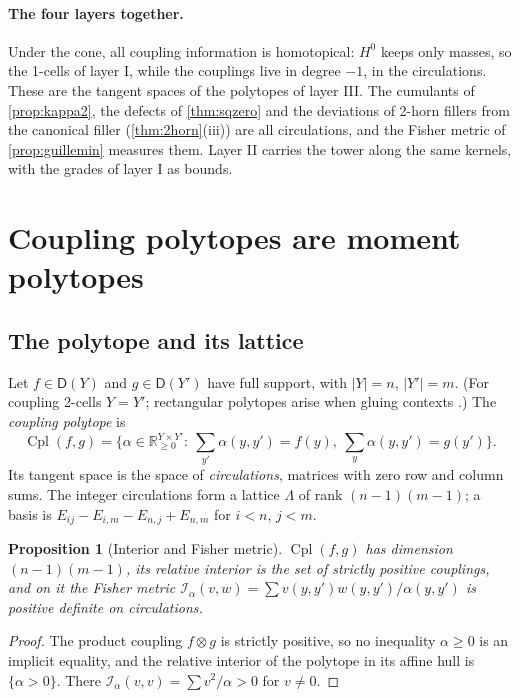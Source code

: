 \documentclass[11pt]{article}
\newtheorem{proposition}[theorem]{Proposition}
\theoremstyle{definition}
\theoremstyle{remark}
\newcommand{\D}{\mathsf{D}}
\newcommand{\Cpl}{\operatorname{Cpl}}
\begin{document}
\paragraph{The four layers together.} Under the cone, all coupling information is homotopical: $H^0$ keeps only
masses, so the 1-cells of layer I, while the couplings live in degree $-1$, in the circulations. These are the
tangent spaces of the polytopes of layer III. The cumulants of \cref{prop:kappa2}, the defects of \cref{thm:sqzero}
and the deviations of 2-horn fillers from the canonical filler (\cref{thm:2horn}(iii)) are all circulations, and
the Fisher metric of \cref{prop:guillemin} measures them. Layer II carries the tower along the same kernels, with
the grades of layer I as bounds.

\section{Coupling polytopes are moment polytopes}\label{sec:toric}

\subsection{The polytope and its lattice}

Let $f\in\D(Y)$ and $g\in\D(Y')$ have full support, with $\lvert Y\rvert=n$, $\lvert Y'\rvert=m$. (For
coupling 2-cells $Y=Y'$; rectangular polytopes arise when gluing contexts
\cite[Prop.~7.11]{Awasthi-Attribution}.) The \emph{coupling polytope} is
\[
\Cpl(f,g)=\Big\{\alpha\in\mathbb{R}_{\ge0}^{Y\times Y'}:\ \textstyle\sum_{y'}\alpha(y,y')=f(y),\
\sum_y\alpha(y,y')=g(y')\Big\}.
\]
Its tangent space is the space of \emph{circulations}, matrices with zero row and column sums. The
integer circulations form a lattice $\Lambda$ of rank $(n-1)(m-1)$; a basis is
$E_{ij}-E_{i,m}-E_{n,j}+E_{n,m}$ for $i<n$, $j<m$.

\begin{proposition}[Interior and Fisher metric]\label{prop:interior}
$\Cpl(f,g)$ has dimension $(n-1)(m-1)$, its relative interior is the set of strictly positive
couplings, and on it the Fisher metric $\mathcal{I}_\alpha(v,w)=\sum v(y,y')w(y,y')/\alpha(y,y')$ is
positive definite on circulations.
\end{proposition}
\begin{proof}
The product coupling $f\otimes g$ is strictly positive, so no inequality $\alpha\ge0$ is an implicit
equality, and the relative interior of the polytope in its affine hull is $\{\alpha>0\}$. There
$\mathcal{I}_\alpha(v,v)=\sum v^2/\alpha>0$ for $v\ne0$.
\end{proof}
\end{document}
